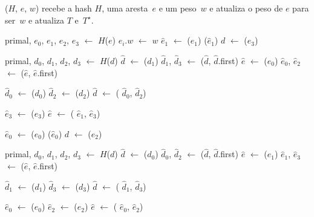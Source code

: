 \newpage
\MSFupdate($H$, $e$, $w$) recebe a hash $H$, uma aresta~$e$ e um peso~$w$ e atualiza o peso de $e$ para ser~$w$ e atualiza $T$ e~$T^\star$.

\begin{algorithm}[htb]
\caption{\MSFupdate($H$, $e$, $w$)}
\label{Algo:MSFupdate}
\begin{algorithmic}[1]
\State primal, $e_0$, $e_1$, $e_2$, $e_3$ $\gets$ $H$($e$)
\State $e_i.w$ $\gets$ $w$
\EndFor
{}\label{Algo:MSFupdate:linhauvinF}
\State $\hat e_1$ $\gets$ \LCOFindNode($e_1$)
\State \LCOEvert($\hat e_1$)
\State $d$ $\gets$ \LCOMin($e_3$)

\State primal, $d_0$, $d_1$, $d_2$, $d_3$ $\gets$ $H$($d$)
\State $\hat d$ $\gets$ \LCOFindNode($d_1$)
\State $\hat d_1$, $\hat d_3$ $\gets$ \LCOSplit($\hat d$, $\hat d$.first)
\State $\hat e$ $\gets$ \LCOFindNode($e_0$)
\State $\hat e_0$, $\hat e_2$ $\gets$ \LCOSplit($\hat e$, $\hat e$.first)


\State $\hat d_0$ $\gets$ \LCOFindNode($d_0$)
\State $\hat d_2$ $\gets$ \LCOFindNode($d_2$)
\State $\hat d$ $\gets$ \LCOMerge( $\hat d_0$, $\hat d_2$)

\State $\hat e_3$ $\gets$ \LCOFindNode($e_3$)
\State $\hat e$ $\gets$ \LCOMerge( $\hat e_1$, $\hat e_3$)

\EndIf

\Else

\State $\hat e_0$ $\gets$ \LCOFindNode($e_0$)
\State \LCOEvert($\hat e_0$)
\State $d$ $\gets$ \LCOMax($e_2$)

\State primal, $d_0$, $d_1$, $d_2$, $d_3$ $\gets$ $H$($d$)
\State $\hat d$ $\gets$ \LCOFindNode($d_0$)
\State $\hat d_0$, $\hat d_2$ $\gets$ \LCOSplit($\hat d$, $\hat d$.first)
\State $\hat e$ $\gets$ \LCOFindNode($e_1$)
\State $\hat e_1$, $\hat e_3$ $\gets$ \LCOSplit($\hat e$, $\hat e$.first)


\State $\hat d_1$ $\gets$ \LCOFindNode($d_1$)
\State $\hat d_3$ $\gets$ \LCOFindNode($d_3$)
\State $\hat d$ $\gets$ \LCOMerge( $\hat d_1$, $\hat d_3$)

\State $\hat e_0$ $\gets$ \LCOFindNode($e_0$)
\State $\hat e_2$ $\gets$ \LCOFindNode($e_2$)
\State $\hat e$ $\gets$ \LCOMerge( $\hat e_0$, $\hat e_2$)




\EndIf
\EndIf
\end{algorithmic}
\end{algorithm}

